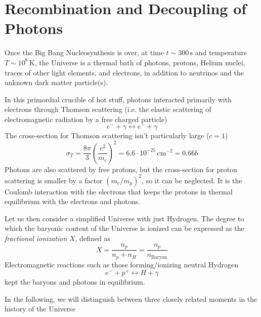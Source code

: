 \section{Recombination and Decoupling of Photons}

\par Once the Big Bang Nucleosynthesis is over, at time $t \sim 300\,\text{s}$ and temperature $T \sim 10^{8}\,\text{K}$, the Universe is a thermal bath of photons, protons, Helium nuclei, traces of other light elements, and electrons, in addition to neutrinos and the unknown dark matter particle(s).
\par In this primordial crucible of hot stuff, photons interacted primarily with electrons through Thomson scattering (i.e. the elastic scattering of electromagnetic radiation by a free charged particle)
\begin{equation}
    e^{-} + \gamma \longleftrightarrow e^{-} + \gamma
    \label{eq:thomsonreaction}
\end{equation}
The cross-section for Thomson scattering isn't particularly large ($c=1$)
\begin{equation}
    \sigma_{T} = \frac{8\pi}{3}\left(\frac{e^{2}}{m_{e}}\right)^{2} = 6.6\cdot 10^{-25}\,\text{cm}^{-2} = 0.66\unit{b}
    \label{eq:thomson_ct}
\end{equation}
Photons are also scattered by free protons, but the cross-section for proton scattering is smaller by a factor $(m_{e}/m_{p})^{2}$, so it can be neglected. It is the Coulomb interaction with the electrons that keeps the protons in thermal equilibrium with the electrons and photons.
\par Let us then consider a simplified Universe with just Hydrogen. The degree to which the baryonic content of the Universe is ionized can be expressed as the \emph{fractional ionization} $X$, defined as
\begin{equation}
    X = \frac{n_{p}}{n_{p}+n_{H}} = \frac{n_{p}}{n_{\text{Baryon}}}
    \label{eq:fractionalionization}
\end{equation}
Electromagnetic reactions such as those forming/ionizing neutral Hydrogen
\begin{equation*}
    e^{-} + p^{+} \longleftrightarrow H + \gamma
\end{equation*}
kept the baryons and photons in equilibrium.
\par In the following, we will distinguish between three closely related moments in the history of the Universe
